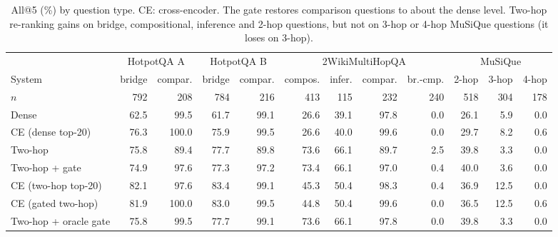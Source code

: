 \begin{table}[t]
\centering
\scriptsize
\caption{All@5 (\%) by question type. CE: cross-encoder. The gate restores comparison questions to about the dense level. Two-hop re-ranking gains on bridge, compositional, inference and 2-hop questions, but not on 3-hop or 4-hop MuSiQue questions (it loses on 3-hop).}
\label{tab:bytype2}
\begin{tabular}{lrrrrrrrrrrr}
\toprule
 & \multicolumn{2}{c}{HotpotQA A} & \multicolumn{2}{c}{HotpotQA B} & \multicolumn{4}{c}{2WikiMultiHopQA} & \multicolumn{3}{c}{MuSiQue} \\
System & bridge & compar. & bridge & compar. & compos. & infer. & compar. & br.-cmp. & 2-hop & 3-hop & 4-hop \\
\midrule
$n$ & 792 & 208 & 784 & 216 & 413 & 115 & 232 & 240 & 518 & 304 & 178 \\
\midrule
Dense & 62.5 & 99.5 & 61.7 & 99.1 & 26.6 & 39.1 & 97.8 & 0.0 & 26.1 & 5.9 & 0.0 \\
CE (dense top-20) & 76.3 & 100.0 & 75.9 & 99.5 & 26.6 & 40.0 & 99.6 & 0.0 & 29.7 & 8.2 & 0.6 \\
Two-hop & 75.8 & 89.4 & 77.7 & 89.8 & 73.6 & 66.1 & 89.7 & 2.5 & 39.8 & 3.3 & 0.0 \\
Two-hop + gate & 74.9 & 97.6 & 77.3 & 97.2 & 73.4 & 66.1 & 97.0 & 0.4 & 40.0 & 3.6 & 0.0 \\
CE (two-hop top-20) & 82.1 & 97.6 & 83.4 & 99.1 & 45.3 & 50.4 & 98.3 & 0.4 & 36.9 & 12.5 & 0.0 \\
CE (gated two-hop) & 81.9 & 100.0 & 83.0 & 99.5 & 44.8 & 50.4 & 99.6 & 0.0 & 36.5 & 12.5 & 0.6 \\
Two-hop + oracle gate & 75.8 & 99.5 & 77.7 & 99.1 & 73.6 & 66.1 & 97.8 & 0.0 & 39.8 & 3.3 & 0.0 \\
\bottomrule
\end{tabular}
\end{table}